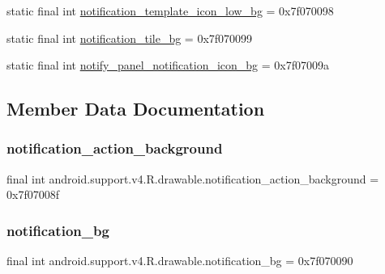 \begin{DoxyCompactItemize}
\item 
static final int \mbox{\hyperlink{classandroid_1_1support_1_1v4_1_1R_1_1drawable_abdbd483972efa7e83398fbc6174f0e9e}{notification\+\_\+template\+\_\+icon\+\_\+low\+\_\+bg}} = 0x7f070098
\item 
static final int \mbox{\hyperlink{classandroid_1_1support_1_1v4_1_1R_1_1drawable_a0131df44a17c930ba8fe4a82cd3be82a}{notification\+\_\+tile\+\_\+bg}} = 0x7f070099
\item 
static final int \mbox{\hyperlink{classandroid_1_1support_1_1v4_1_1R_1_1drawable_a6ec51c56e3b56f429d97dde6d2b6ebaa}{notify\+\_\+panel\+\_\+notification\+\_\+icon\+\_\+bg}} = 0x7f07009a
\end{DoxyCompactItemize}


\subsection{Member Data Documentation}
\mbox{\label{classandroid_1_1support_1_1v4_1_1R_1_1drawable_a1c5ea12cd4bf083ceae928a72012a29d}} 
\subsubsection{\texorpdfstring{notification\+\_\+action\+\_\+background}{notification\_action\_background}}
{\footnotesize\ttfamily final int android.\+support.\+v4.\+R.\+drawable.\+notification\+\_\+action\+\_\+background = 0x7f07008f\hspace{0.3cm}{\ttfamily [static]}}

\mbox{\label{classandroid_1_1support_1_1v4_1_1R_1_1drawable_a0d0d6a26167a46b4f5473be51838a398}} 
\subsubsection{\texorpdfstring{notification\+\_\+bg}{notification\_bg}}
{\footnotesize\ttfamily final int android.\+support.\+v4.\+R.\+drawable.\+notification\+\_\+bg = 0x7f070090\hspace{0.3cm}{\ttfamily [static]}}

